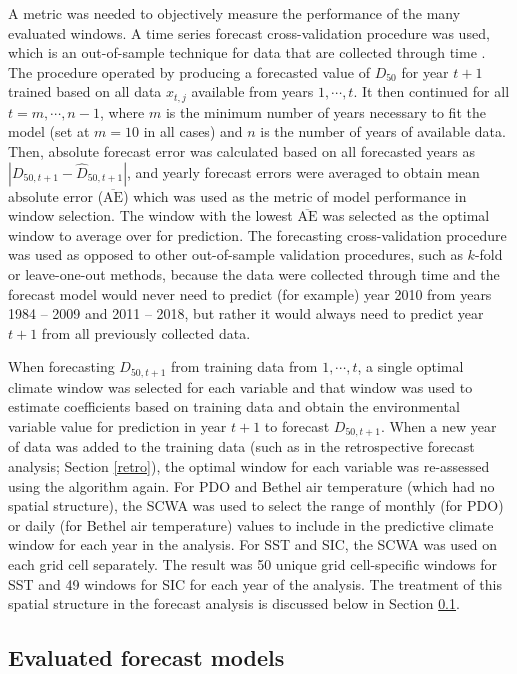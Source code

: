 \documentclass[12pt,]{book}
\theoremstyle{definition}
\theoremstyle{definition}
\theoremstyle{definition}
\theoremstyle{remark}
\begin{document}
\noindent
A metric was needed to objectively measure the performance of the many
evaluated windows. A time series forecast cross-validation procedure was
used, which is an out-of-sample technique for data that are collected
through time \citep{arlot-celisse-2010}. The procedure operated by
producing a forecasted value of \(D_{50}\) for year \(t+1\) trained
based on all data \(x_{t,j}\) available from years \(1, \cdots, t\). It
then continued for all \(t = m, \cdots, n-1\), where \(m\) is the
minimum number of years necessary to fit the model (set at \(m = 10\) in
all cases) and \(n\) is the number of years of available data. Then,
absolute forecast error was calculated based on all forecasted years as
\(|D_{50,t+1} - \hat{D}_{50,t+1}|\), and yearly forecast errors were
averaged to obtain mean absolute error (\(\overline{\text{AE}}\)) which
was used as the metric of model performance in window selection. The
window with the lowest \(\overline{\text{AE}}\) was selected as the
optimal window to average over for prediction. The forecasting
cross-validation procedure was used as opposed to other out-of-sample
validation procedures, such as \(k\)-fold or leave-one-out methods,
because the data were collected through time and the forecast model
would never need to predict (for example) year 2010 from years 1984 --
2009 and 2011 -- 2018, but rather it would always need to predict year
\(t+1\) from all previously collected data.

When forecasting \(D_{50,t+1}\) from training data from \(1, \cdots,t\),
a single optimal climate window was selected for each variable and that
window was used to estimate coefficients based on training data and
obtain the environmental variable value for prediction in year \(t+1\)
to forecast \(D_{50,t+1}\). When a new year of data was added to the
training data (such as in the retrospective forecast analysis; Section
\ref{retro}), the optimal window for each variable was re-assessed using
the algorithm again. For PDO and Bethel air temperature (which had no
spatial structure), the SCWA was used to select the range of monthly
(for PDO) or daily (for Bethel air temperature) values to include in the
predictive climate window for each year in the analysis. For SST and
SIC, the SCWA was used on each grid cell separately. The result was 50
unique grid cell-specific windows for SST and 49 windows for SIC for
each year of the analysis. The treatment of this spatial structure in
the forecast analysis is discussed below in Section \ref{rtf-models}.

\subsection{Evaluated forecast models}\label{rtf-models}
\end{document}
